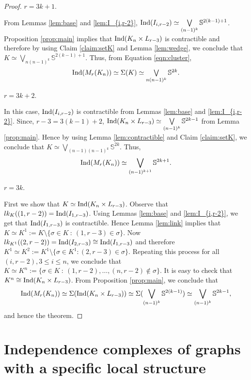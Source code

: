 \documentclass[12pt]{article}
\numberwithin{thm}{section}
\theoremstyle{definition}
\newcommand{\bS}{\mathbb{S}}
\newcommand{\ind}{{\rm{Ind}}}
\begin{document}
\begin{proof}
 $r = 3k+1$.

From Lemmas  \ref{lem:base} and \ref{lem:I_{i,r-2}}, $\ind(I_{i,r-2}) \simeq \bigvee\limits_{(n-1)^{k}} \bS^{2(k-1)+1}$.  Proposition  \ref{prop:main} implies that  $\ind(K_n \times L_{r-3})$ is contractible and therefore  by using Claim \ref{claim:setK} and Lemma \ref{lem:wedge}, we conclude that $K \simeq \bigvee\limits_{n(n-1)^k} \bS^{2(k-1)+1}$. Thus,  from Equation \eqref{eqn:cluster}, $$\textstyle \ind(M_r(K_n)) \simeq \Sigma(K) \simeq \bigvee\limits_{n(n-1)^k} \bS^{2k}.$$

 $r  = 3k+2$.

In this case, $\ind(I_{i,r-2})$ is contractible  from Lemmas \ref{lem:base} and \ref{lem:I_{i,r-2}}. Since,  $r-3 = 3(k-1)+2$, $\ind(K_n \times L_{r-3})  \simeq \bigvee\limits_{(n-1)^k} \bS^{2k-1}$ from Lemma \ref{prop:main}. Hence by using Lemma \ref{lem:contractible} and Claim \ref{claim:setK}, we conclude that  $K \simeq \bigvee\limits_{(n-1)(n-1)^k} \bS^{2k} $. Thus,
$$\ind(M_r(K_n)) \simeq \bigvee\limits_{(n-1)^{k+1}} \bS^{2k+1}.$$

 $r = 3k$.

First we show that $K \simeq \ind(K_n \times L_{r-3})$. Observe that $lk_K((1,r-2)) = \ind(I_{1,r-3})$. Using Lemmas \ref{lem:base} and \ref{lem:I_{i,r-2}}, we get that $\ind(I_{1,r-3})$ is contractible. Hence  Lemma \ref{lem:link} implies that $K \simeq K^{1} := K \setminus \{\sigma \in K \ : \ (1,r-3)\in \sigma\}$.  Now  $lk_{K^1}((2,r-2)) = \ind(I_{2,r-3})\cong \ind(I_{1,r-3})$ and therefore $K^1 \simeq K^2 := K^1 \setminus \{\sigma \in K^1  :  (2,r-3) \in \sigma\}$. Repeating this process for all $(i, r-2), 3 \leq i \leq n$, we conclude that $K \simeq K^n  :=\{\sigma \in K \ : \ (1,r-2), \ldots, (n,r-2) \notin \sigma\}$. It is easy to check  that 
$K^n \cong \ind(K_n \times L_{r-3})$.
From Proposition \ref{prop:main}, we conclude that $$\ind(M_r(K_n))  \simeq \Sigma(\ind(K_n \times L_{r-3})) \simeq \Sigma(\bigvee\limits_{(n-1)^k} \bS^{2(k-1)}) \simeq \bigvee\limits_{(n-1)^k} \bS^{2k-1},$$ and hence the theorem.
\end{proof}


\section{Independence complexes of graphs with a specific local structure}\label{sec:subdivision}
\end{document}
